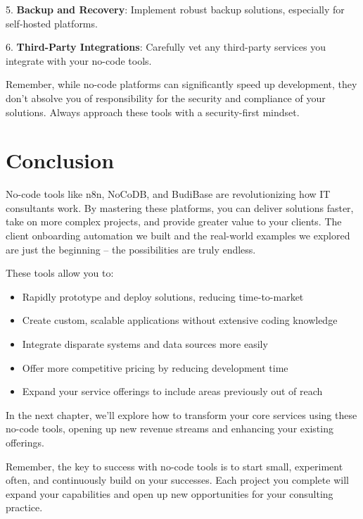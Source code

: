 5. \textbf{Backup and Recovery}: Implement robust backup solutions, especially for self-hosted platforms.

6. \textbf{Third-Party Integrations}: Carefully vet any third-party services you integrate with your no-code tools.

Remember, while no-code platforms can significantly speed up development, they don't absolve you of responsibility for the security and compliance of your solutions. Always approach these tools with a security-first mindset.

\section{Conclusion}

No-code tools like n8n, NoCoDB, and BudiBase are revolutionizing how IT consultants work. By mastering these platforms, you can deliver solutions faster, take on more complex projects, and provide greater value to your clients. The client onboarding automation we built and the real-world examples we explored are just the beginning – the possibilities are truly endless.

These tools allow you to:

\begin{itemize}
    \item Rapidly prototype and deploy solutions, reducing time-to-market
    \item Create custom, scalable applications without extensive coding knowledge
    \item Integrate disparate systems and data sources more easily
    \item Offer more competitive pricing by reducing development time
    \item Expand your service offerings to include areas previously out of reach
\end{itemize}

In the next chapter, we'll explore how to transform your core services using these no-code tools, opening up new revenue streams and enhancing your existing offerings.

\begin{importantbox}
    Remember, the key to success with no-code tools is to start small, experiment often, and continuously build on your successes. Each project you complete will expand your capabilities and open up new opportunities for your consulting practice.
\end{importantbox}

